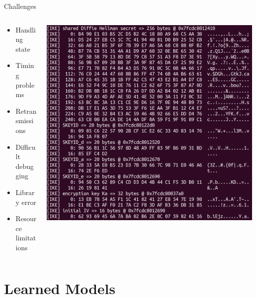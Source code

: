 \documentclass[aspectratio=169, xcolor=table]{beamer}
\begin{document}
\begin{frame}{Challenges}
	\vspace{-1.5em}
	\begin{columns}[T]
		\begin{column}{0.5\textwidth}
			\begin{itemize}
				\item Handling state %
				\pause
				\item Timing problems %
				\pause
				\item Retransmissions
				\pause
				\item Difficult debugging
				\pause
				\item Library error %
				\pause
				\item Resource limitations %
			\end{itemize}
		\end{column}
		\begin{column}{0.5\textwidth}
			\includegraphics[width=0.85\linewidth]{images/key_material_log}
		\end{column}
	\end{columns}
\end{frame}

\section*{Learned Models}
\end{document}
